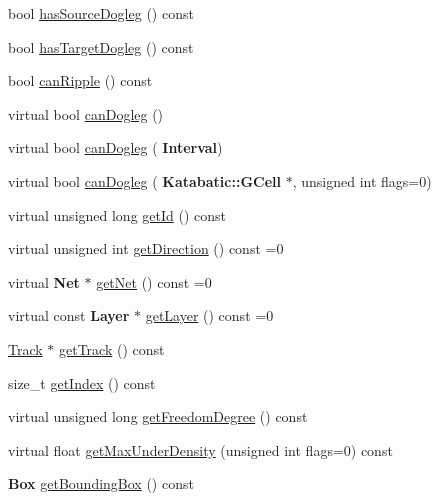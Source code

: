 \begin{DoxyCompactItemize}
\item 
bool \mbox{\hyperlink{classKite_1_1TrackElement_ab0ab07d0bdd701562ecc14bbdb41368d}{has\+Source\+Dogleg}} () const
\item 
bool \mbox{\hyperlink{classKite_1_1TrackElement_a2f1f15d433698222015fdda8e7fb599c}{has\+Target\+Dogleg}} () const
\item 
bool \mbox{\hyperlink{classKite_1_1TrackElement_a9b37c425c3152c576444ac0253b04f9f}{can\+Ripple}} () const
\item 
virtual bool \mbox{\hyperlink{classKite_1_1TrackElement_aa0bb6f1592688e942ff67e0ac318a4fd}{can\+Dogleg}} ()
\item 
virtual bool \mbox{\hyperlink{classKite_1_1TrackElement_accb4c6a7ee2678a0cff4dbc4a7860fe1}{can\+Dogleg}} (\textbf{ Interval})
\item 
virtual bool \mbox{\hyperlink{classKite_1_1TrackElement_a4f040cf33009e4886d401115c3bea838}{can\+Dogleg}} (\textbf{ Katabatic\+::\+G\+Cell} $\ast$, unsigned int flags=0)
\item 
virtual unsigned long \mbox{\hyperlink{classKite_1_1TrackElement_afdedcef127ad2a3677a5b48d7d3453f3}{get\+Id}} () const
\item 
virtual unsigned int \mbox{\hyperlink{classKite_1_1TrackElement_ae35b78590ed6aa546b626ef95f28c533}{get\+Direction}} () const =0
\item 
virtual \textbf{ Net} $\ast$ \mbox{\hyperlink{classKite_1_1TrackElement_a2b383a5b6f5028911a35e446a682dabd}{get\+Net}} () const =0
\item 
virtual const \textbf{ Layer} $\ast$ \mbox{\hyperlink{classKite_1_1TrackElement_ad96c66549598873bf68c2e18ec7164c1}{get\+Layer}} () const =0
\item 
\mbox{\hyperlink{classKite_1_1Track}{Track}} $\ast$ \mbox{\hyperlink{classKite_1_1TrackElement_a3f34f9139b8491a0adb531ac3a904171}{get\+Track}} () const
\item 
size\+\_\+t \mbox{\hyperlink{classKite_1_1TrackElement_ad65a47a8b8a83be5d0b456b1074d1220}{get\+Index}} () const
\item 
virtual unsigned long \mbox{\hyperlink{classKite_1_1TrackElement_aa7552c20cc46abcac558627b2ca341f8}{get\+Freedom\+Degree}} () const
\item 
virtual float \mbox{\hyperlink{classKite_1_1TrackElement_aa34ceb4288e76357b65725ca00e56df8}{get\+Max\+Under\+Density}} (unsigned int flags=0) const
\item 
\textbf{ Box} \mbox{\hyperlink{classKite_1_1TrackElement_ab5d8bf98ab5af6fcfebea1b9f446d5d7}{get\+Bounding\+Box}} () const

\end{DoxyCompactItemize}
